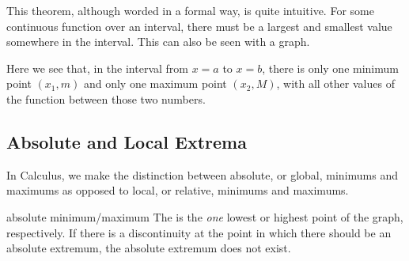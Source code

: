 This theorem, although worded in a formal way, is quite intuitive. For some continuous function over an interval, there must be a largest and smallest value somewhere in the interval. This can also be seen with a graph.

\begin{center}
\end{center}

Here we see that, in the interval from \( x = a \) to \( x = b \), there is only one minimum point \( \left( x_1, m \right) \) and only one maximum point \( \left( x_2, M \right) \), with all other values of the function between those two numbers.

\subsection{Absolute and Local Extrema}

In Calculus, we make the distinction between absolute, or global, minimums and maximums as opposed to local, or relative, minimums and maximums.

\begin{definition}{absolute minimum/maximum}
    The  is the \textit{one} lowest or highest point of the graph, respectively. If there is a discontinuity at the point in which there should be an absolute extremum, the absolute extremum does not exist.
\end{definition}

